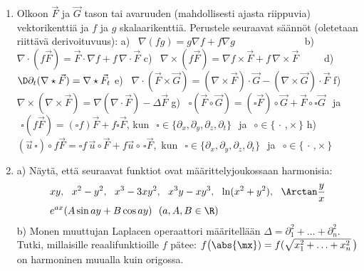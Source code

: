 \begin{enumerate}
\item \label{H-udif-4: nablaamissääntöjä}
Olkoon $\vec F$ ja $\vec G$ tason tai avaruuden (mahdollisesti ajasta riippuvia) vektorikenttiä
ja $f$ ja $g$ skalaarikenttiä. Perustele seuraavat säännöt
(oletetaan riittävä derivoituvuus): \vspace{1mm}\newline
a) \ $\nabla(fg)=g\nabla f+f\nabla g\qquad\qquad\qquad\ \ \ $
b) \ $\nabla\cdot(f\vec F)=\vec F\cdot\nabla f+f\,\nabla\cdot\vec F$ \vspace{1mm}\newline
c) \ $\nabla\times(f\vec F)=\nabla f\times\vec F+f\,\nabla\times\vec F\qquad\ $
d) \ $\D\partial_t(\nabla\star\vec F)=\nabla\star\vec F_t$ \vspace{1mm}\newline
e) \ $\nabla\cdot(\vec F\times\vec G)=(\nabla\times\vec F)\cdot\vec G
                                        -(\nabla\times\vec G)\cdot\vec F$ \vspace{1mm}\newline
f) \ $\nabla\times(\nabla\times\vec F)
                  =\nabla(\nabla\cdot\vec F)-\Delta\vec F$ \vspace{1mm}\newline
g) \ $\square(\vec F\circ\vec G) = (\square\vec F)\circ\vec G+\vec F\circ\square\vec G \,\ $
     ja $\,\ \square(f\vec F)=(\square f)\vec F+f\square\vec F$, \newline
     kun $\,\ \square\in\{\partial_x,\partial_y,\partial_z,\partial_t\}\,\ $ ja
     $\,\ \circ\in\{\,\cdot\,,\times\,\}$ \vspace{1mm}\newline
h) \ $(\vec u\,\square)\circ f\vec F 
      = \square f\,\vec u\circ\vec F+f\vec u\circ\,\square\vec F$,\, kun
     $\,\ \square\in\{\partial_x,\partial_y,\partial_z,\partial_t\}\,\ $ ja
     $\,\ \circ\in\{\,\cdot\,,\times\,\}$ \newline

\item
a) Näytä, että seuraavat funktiot ovat määrittelyjoukossaan harmonisia:
\begin{align*}
&xy,\ \ x^2-y^2,\ \ x^3-3xy^2,\ \ x^3y-xy^3,\ \ \ln(x^2+y^2),\ \ \Arctan\frac{y}{x} \\
&e^{ax}(A\sin ay+B\cos ay)\ \ (a,A,B\in\R)
\end{align*}
b) Monen muuttujan Laplacen operaattori määritellään
$\Delta=\partial_1^2+ \ldots + \partial_n^2$. Tutki, millaisille reaalifunktioille $f$ pätee: 
$f\bigl(\abs{\mx})=f(\sqrt{x_1^2 + \ldots + x_n^2}\,\bigr)$ on harmoninen muualla kuin origossa.


\end{enumerate}
